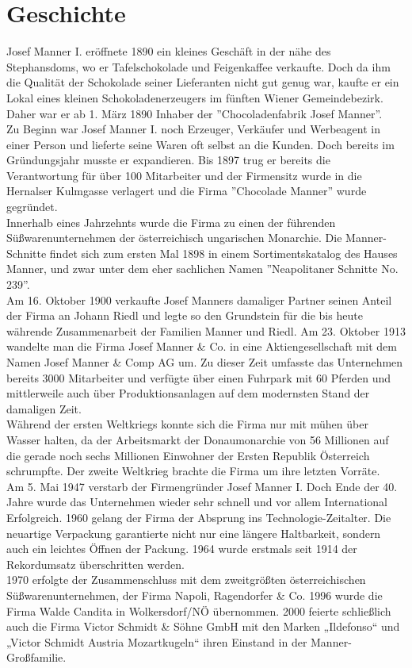 \section{Geschichte}
Josef Manner I. eröffnete 1890 ein kleines Geschäft in der nähe des Stephansdoms, wo er Tafelschokolade und Feigenkaffee verkaufte. Doch da ihm die Qualität der Schokolade seiner Lieferanten nicht gut genug war, kaufte er ein Lokal eines kleinen Schokoladenerzeugers im fünften Wiener Gemeindebezirk. Daher war er ab 1. März 1890 Inhaber der ''Chocoladenfabrik Josef Manner''. \\
Zu Beginn war Josef Manner I. noch Erzeuger, Verkäufer und Werbeagent in einer Person und lieferte seine Waren oft selbst an die Kunden. Doch bereits im Gründungsjahr musste er expandieren. Bis 1897 trug er bereits die Verantwortung für über 100 Mitarbeiter und der Firmensitz wurde in die Hernalser Kulmgasse verlagert und die Firma ''Chocolade Manner'' wurde gegründet.\\
Innerhalb eines Jahrzehnts wurde die Firma zu einen der führenden Süßwarenunternehmen der österreichisch ungarischen Monarchie. 
Die Manner-Schnitte findet sich zum ersten Mal 1898 in einem Sortimentskatalog des Hauses Manner, und zwar unter dem eher sachlichen Namen ''Neapolitaner Schnitte No. 239''. \\
Am 16. Oktober 1900 verkaufte Josef Manners damaliger Partner seinen Anteil der Firma an Johann Riedl  und legte so den Grundstein für die bis heute währende Zusammenarbeit der Familien Manner und Riedl.
Am 23. Oktober 1913 wandelte man die Firma Josef Manner \& Co. in eine Aktiengesellschaft mit dem Namen Josef Manner \& Comp AG um. Zu dieser Zeit umfasste das Unternehmen bereits 3000 Mitarbeiter und verfügte über einen Fuhrpark mit 60 Pferden und mittlerweile auch über Produktionsanlagen auf dem modernsten Stand der damaligen Zeit. \\
Während der ersten Weltkriegs konnte sich die Firma nur mit mühen über Wasser halten, da der Arbeitsmarkt der Donaumonarchie von 56 Millionen auf die gerade noch sechs Millionen Einwohner der Ersten Republik Österreich schrumpfte. Der zweite Weltkrieg brachte die Firma um ihre letzten Vorräte.\\
Am 5. Mai 1947 verstarb der Firmengründer Josef Manner I. Doch Ende der 40. Jahre wurde das Unternehmen wieder sehr schnell und vor allem International Erfolgreich. 1960 gelang der Firma der Absprung ins Technologie-Zeitalter. Die neuartige Verpackung garantierte nicht nur eine längere Haltbarkeit, sondern auch ein leichtes Öffnen der Packung. 1964 wurde erstmals seit 1914 der Rekordumsatz überschritten werden.\\
1970 erfolgte der Zusammenschluss mit dem zweitgrößten österreichischen Süßwarenunternehmen, der Firma Napoli, Ragendorfer \& Co. 1996 wurde die Firma Walde Candita in Wolkersdorf/NÖ übernommen. 2000 feierte schließlich auch die Firma Victor Schmidt \& Söhne GmbH mit den Marken „Ildefonso“ und „Victor Schmidt Austria Mozartkugeln“ ihren Einstand in der Manner-Großfamilie. \cite{josef_manner_unternehmen}